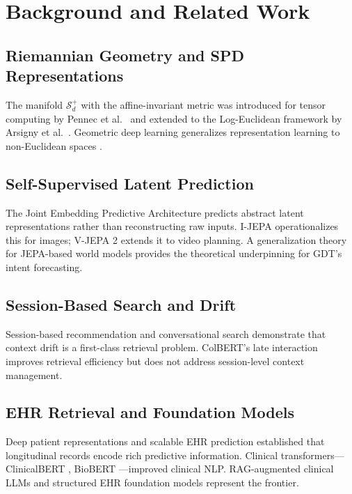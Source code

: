 \documentclass[journal,10pt,twoside]{IEEEtran}
\begin{document}
\section{Background and Related Work}
\label{sec:background}

\subsection{Riemannian Geometry and SPD Representations}
The manifold $\mathcal{S}_d^+$ with the affine-invariant metric was introduced for tensor computing by Pennec et al.\ \cite{pennec2006_spd} and extended to the Log-Euclidean framework by Arsigny et al.\ \cite{arsigny2007_logeuclidean}. Geometric deep learning generalizes representation learning to non-Euclidean spaces \cite{bronstein2017}.

\subsection{Self-Supervised Latent Prediction}
The Joint Embedding Predictive Architecture \cite{lecun2022} predicts abstract latent representations rather than reconstructing raw inputs. I-JEPA \cite{assran2023_ijepa} operationalizes this for images; V-JEPA 2 \cite{assran2025_vjepa2} extends it to video planning. A generalization theory for JEPA-based world models \cite{cui2026_jepa_theory} provides the theoretical underpinning for GDT's intent forecasting.

\subsection{Session-Based Search and Drift}
Session-based recommendation \cite{hidasi2015,wu2019_session} and conversational search \cite{iyyer20,zamani20} demonstrate that context drift is a first-class retrieval problem. ColBERT's late interaction \cite{khattab20} improves retrieval efficiency but does not address session-level context management.

\subsection{EHR Retrieval and Foundation Models}
Deep patient representations \cite{miotto2016} and scalable EHR prediction \cite{rajkomar2018} established that longitudinal records encode rich predictive information. Clinical transformers---ClinicalBERT \cite{huang2019_clinicalbert}, BioBERT \cite{lee2020_biobert}---improved clinical NLP. RAG-augmented clinical LLMs \cite{liu2025_rag_biomed} and structured EHR foundation models \cite{guo2026_porter,shurrab2026_ehrragp} represent the frontier.
\end{document}
